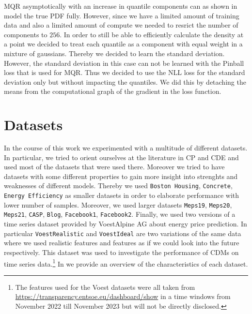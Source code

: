 MQR asymptotically with an increase in quantile components can as shown in  model the true PDF fully. However, since we have a limited amount of training data and also a limited amount of compute we needed to resrict the number of components to $256$. In order to still be able to efficiently calculate the density at a point we decided to treat each quantile as a component with equal weight in a mixture of gaussians. Thereby we decided to learn the standard deviation. However, the standard deviation in this case can not be learned with the Pinball loss that is used for MQR. Thus we decided to use the NLL loss for the standard deviation only but without impacting the quantiles. We did this by detaching the means from the computational graph of the gradient in the loss function.

\section{Datasets}\label{sec:datasets}

In the course of this work we experimented with a multitude of different datasets. In particular, we tried to orient ourselves at the literature in CP and CDE \cite{rothfuss2019noise,sesia2021conformal} and used most of the datasets that were used there. Moreover we tried to have datasets with some different properties to gain more insight into strenghts and weaknesses of different models. Thereby we used \texttt{Boston Housing}, \texttt{Concrete}, \texttt{Energy Efficiency} as smaller datasets in order to elaborate performance with lower number of samples. Moreover, we used larger datasets \texttt{Meps19}, \texttt{Meps20}, \texttt{Meps21}, \texttt{CASP}, \texttt{Blog}, \texttt{Facebook1}, \texttt{Facebook2}. Finally, we used two versions of a time series dataset provided by VoestAlpine AG about energy price prediction. In particular \texttt{VoestRealistic} and \texttt{VoestIdeal} are two variations of the same data where we used realistic features and features as if we could look into the future respectively. This dataset was used to investigate the performance of CDMs on time series data.\footnote{The features used for the Voest datasets were all taken from \url{https://transparency.entsoe.eu/dashboard/show} in a time windows from November 2022 till November 2023 but will not be directly disclosed.} In  we provide an overview of the characteristics of each dataset.

